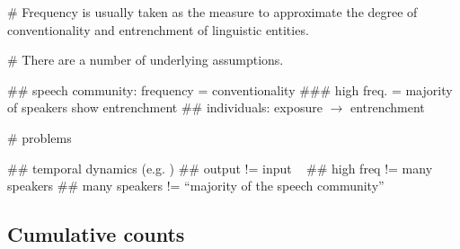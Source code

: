 \documentclass[a4paper]{scrartcl}
\begin{document}
  \begin{easylist}[itemize]

    # Frequency is usually taken as the measure to approximate the degree of conventionality and entrenchment of linguistic entities.

    # There are a number of underlying assumptions.

      ## speech community: frequency = conventionality
        ### high freq. = majority of speakers show entrenchment
      ## individuals: exposure $\rightarrow$ entrenchment

    # problems

      ## temporal dynamics (e.g. )
      ## output != input ~\parencite{Stefanowitsch2017}
      ## high freq != many speakers
      ## many speakers != \enquote{majority of the speech community}

  \end{easylist}

  \subsection{Cumulative counts}
\end{document}

